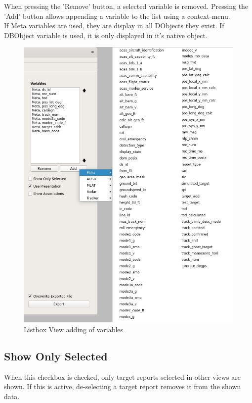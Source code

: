 When pressing the 'Remove' button, a selected variable is removed.  Pressing the 'Add' button allows appending a variable to the list using a context-menu. \\

If Meta variables are used, they are display in all DObjects they exist. If DBObject variable is used, it is only displayed in it's native object.

\begin{figure}[H]
    \includegraphics[width=16cm,frame]{../screenshots/listbox_add.png}
  \caption{Listbox View adding of variables}
\end{figure}


\subsection{Show Only Selected}
When this checkbox is checked, only target reports selected in other views are shown. If this is active, de-selecting a target report removes it from the shown data.

